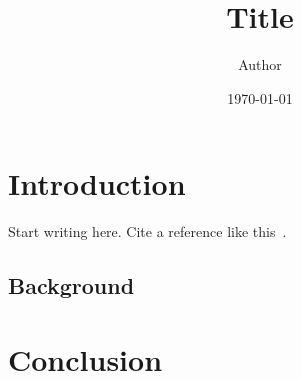\documentclass[11pt,a4paper]{report}
\title{Title}
\author{Author}
\date{\today}
\begin{document}
\maketitle
\tableofcontents

\chapter{Introduction}

Start writing here. Cite a reference like this~\cite{knuth1984}.

\section{Background}

\chapter{Conclusion}



\end{document}
